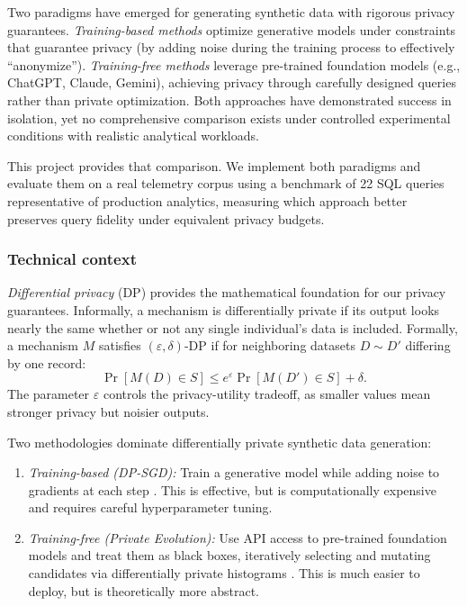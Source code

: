 \documentclass[12pt,letterpaper]{article}
\renewcommand{\_}{\textunderscore\allowbreak}
\begin{document}
Two paradigms have emerged for generating synthetic data with rigorous privacy guarantees. \textit{Training-based methods} optimize generative models under constraints that guarantee privacy (by adding noise during the training process to effectively ``anonymize''). \textit{Training-free methods} leverage pre-trained foundation models (e.g., ChatGPT, Claude, Gemini), achieving privacy through carefully designed queries rather than private optimization. Both approaches have demonstrated success in isolation, yet no comprehensive comparison exists under controlled experimental conditions with realistic analytical workloads.

This project provides that comparison. We implement both paradigms and evaluate them on a real telemetry corpus using a benchmark of 22 SQL queries representative of production analytics, measuring which approach better preserves query fidelity under equivalent privacy budgets.

\subsubsection{Technical context}

\textit{Differential privacy} (DP) provides the mathematical foundation for our privacy guarantees. Informally, a mechanism is differentially private if its output looks nearly the same whether or not any single individual's data is included. Formally, a mechanism $M$ satisfies $(\varepsilon, \delta)$-DP if for neighboring datasets $D \sim D'$ differing by one record:
\begin{equation}
    \Pr[M(D) \in S] \leq e^{\varepsilon} \Pr[M(D') \in S] + \delta.
\end{equation}
The parameter $\varepsilon$ controls the privacy-utility tradeoff, as smaller values mean stronger privacy but noisier outputs.

Two methodologies dominate differentially private synthetic data generation:

\begin{enumerate}
    \item \textit{Training-based (DP-SGD):} Train a generative model while adding noise to gradients at each step \citep{abadi2016deep}. This is effective, but is computationally expensive and requires careful hyperparameter tuning.
    
    \item \textit{Training-free (Private Evolution):} Use API access to pre-trained foundation models and treat them as black boxes, iteratively selecting and mutating candidates via differentially private histograms \citep{lin2025differentiallyprivatesyntheticdata}. This is much easier to deploy, but is theoretically more abstract.
\end{enumerate}
\end{document}
